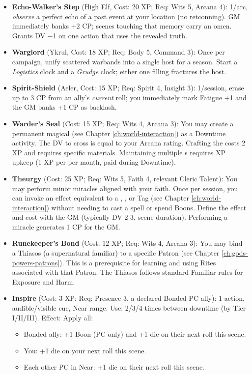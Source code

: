 \begin{itemize}
    \item \textbf{Echo-Walker's Step} (High Elf, Cost: 20 XP; Req: Wits 5, Arcana 4): 
1/arc, \emph{observe} a perfect echo of a past event at your location (no retconning). 
GM immediately banks +2 CP; scenes touching that memory carry an omen. Grants DV −1 on one action that uses the revealed truth.
    \item \textbf{Warglord} (Ykrul, Cost: 18 XP; Req: Body 5, Command 3): 
Once per campaign, unify scattered warbands into a single host for a season. Start a \emph{Logistics} clock and a \emph{Grudge} clock; either one filling fractures the host.
    \item \textbf{Spirit-Shield} (Aeler, Cost: 15 XP; Req: Spirit 4, Insight 3): 
1/session, erase up to 3 CP from an ally's \emph{current} roll; you immediately mark Fatigue +1 and the GM banks +1 CP as backlash.
    \item \textbf{Warder's Seal} (Cost: 15 XP; Req: Wits 4, Arcana 3): You may create a permanent magical  (see Chapter \ref{ch:world-interaction}) as a Downtime activity. The DV to cross is equal to your Arcana rating. Crafting the  costs 2 XP and requires specific materials. Maintaining multiple s requires XP upkeep (1 XP per  per month, paid during Downtime).
    \item \textbf{Theurgy} (Cost: 25 XP; Req: Wits 5, Faith 4, relevant Cleric Talent): You may perform minor miracles aligned with your faith. Once per session, you can invoke an effect equivalent to a , , or  Tag (see Chapter \ref{ch:world-interaction}) without needing to cast a spell or spend Boons. Define the effect and cost with the GM (typically DV 2-3, scene duration). Performing a miracle generates 1 CP for the GM.
    \item \textbf{Runekeeper's Bond} (Cost: 12 XP; Req: Wits 4, Arcana 3): You may bind a Thiasos (a supernatural familiar) to a specific Patron (see Chapter \ref{ch:gods-powers-patrons}). This is a prerequisite for learning and using Rites associated with that Patron. The Thiasos follows standard Familiar rules for Exposure and Harm.
    \item \textbf{Inspire} (Cost: 3 XP; Req: Presence 3, a declared Bonded PC ally): 
1 action, audible/visible cue, Near range. Use: 2/3/4 times between downtime (by Tier I/II/III). Effect: Apply all:
\begin{itemize}
    \item Bonded ally: +1 Boon (PC only) and +1 die on their next roll this scene.
    \item You: +1 die on your next roll this scene.
    \item Each other PC in Near: +1 die on their next roll this scene.
\end{itemize}
\end{itemize}

